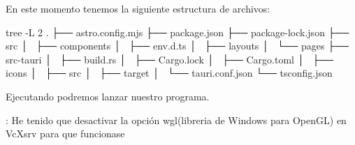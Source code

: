En este momento tenemos la siguiente estructura de archivos:
\begin{multicli}
\cliarrow tree -L 2 \newline
.  \newline
├── astro.config.mjs \newline
├── package.json \newline
├── package-lock.json \newline
├── src \newline
│   ├── components  \newline
│   ├── env.d.ts \newline
│   ├── layouts \newline
│   └── pages \newline
├── src-tauri \newline
│   ├── build.rs \newline
│   ├── Cargo.lock \newline
│   ├── Cargo.toml \newline
│   ├── icons \newline
│   ├── src \newline
│   ├── target \newline
│   └── tauri.conf.json \newline
└── tsconfig.json
\end{multicli}

Ejecutando  podremos lanzar nuestro programa. \par

: He tenido que desactivar la opción wgl(libreria de Windows para OpenGL) en VcXsrv para que funcionase
